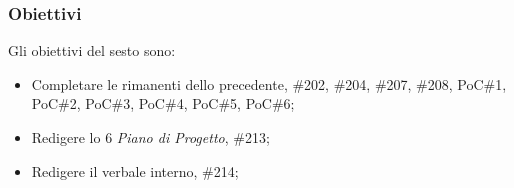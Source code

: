 \subsubsection{Obiettivi}
\label{sec:sprint6_obiettivi}
Gli obiettivi del sesto  sono:
\begin{itemize}
    \item Completare le  rimanenti dello  precedente,  \#202, \#204, \#207, \#208, PoC\#1, PoC\#2, PoC\#3, PoC\#4, PoC\#5, PoC\#6;
    \item Redigere lo  6 \textit{Piano di Progetto},  \#213;
    \item Redigere il verbale interno,  \#214;
\end{itemize}